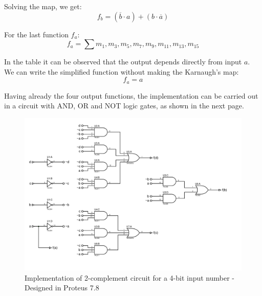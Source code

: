         Solving the map, we get:
        \[
            \boxed{f_b=(\overline{b} \cdot a)+(b \cdot \overline{a})}    
        \]\par
        For the last function $f_a$:
        \[
            f_{a}=\sum{m_1,m_3,m_5,m_7,m_9,m_{11},m_{13},m_{15}}    
        \]\par
        In the table it can be observed that the output depends 
        directly from input $a$. We can write the simplified 
        function without making the Karnaugh's map:
        \[
            \boxed{f_a=a}    
        \]
        \par
        Having already the four output functions, the implementation
        can be carried out in a circuit with AND, OR and NOT logic gates,
        as shown in the next page.
        \newpage
        \begin{figure}[H]
            \begin{centering}
            \includegraphics[width=1\textwidth]{data/ImplementacionEj4}
            \par\end{centering}
            \caption{Implementation of 2-complement circuit for a 4-bit input number - Designed in Proteus 7.8}
        \end{figure}
        

